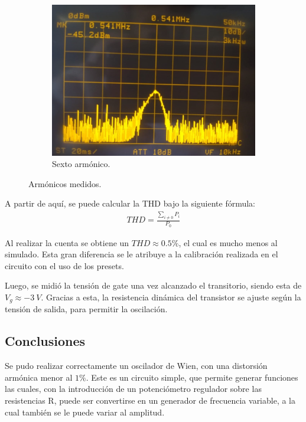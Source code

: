 \begin{figure}[H]
\begin{subfigure}{.425\textwidth}
	\includegraphics[width=\textwidth]{Imagenes-Ej1/6Armonico.jpeg}
	\caption{Sexto armónico.}
	\label{fig:6to}
\end{subfigure}
\caption{Armónicos medidos.}
\label{fig:armon}
\end{figure}

A partir de aquí, se puede calcular la THD bajo la siguiente fórmula:
\begin{align}
	THD= \frac{\sum_{i\neq 0} P_i}{P_0}
\end{align}

Al realizar la cuenta se obtiene un $THD \approx 0.5\%$, el cual es mucho menos al simulado. Esta gran diferencia se le atribuye a la calibración realizada en el circuito con el uso de los presets.

Luego, se midió la tensión de gate una vez alcanzado el transitorio, siendo esta de $V_g \approx -3 \ V$. Gracias a esta, la resistencia dinámica del transistor se ajuste según la tensión de salida, para permitir la oscilación.

\subsection{Conclusiones}
Se pudo realizar correctamente un oscilador de Wien, con una distorsión armónica menor al $1\%$. Este es un circuito simple, que permite generar funciones las cuales, con la introducción de un potenciómetro regulador sobre las resistencias R, puede ser convertirse en un generador de frecuencia variable, a la cual también se le puede variar al amplitud.